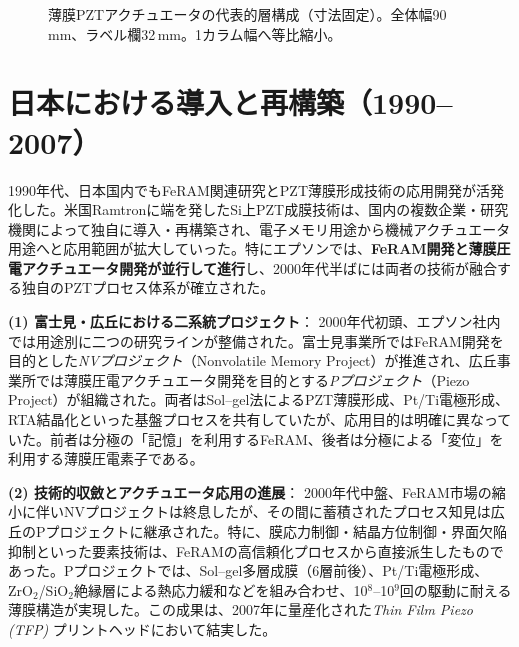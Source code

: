 \documentclass[conference]{IEEEtran}
\begin{document}
\begin{figure}[!t]
{%
}
\caption{薄膜PZTアクチュエータの代表的層構成（寸法固定）。全体幅90\,mm、ラベル欄32\,mm。1カラム幅へ等比縮小。}
\label{fig:stack}
\end{figure}

\section{日本における導入と再構築（1990--2007）}
1990年代、日本国内でもFeRAM関連研究とPZT薄膜形成技術の応用開発が活発化した。米国Ramtronに端を発したSi上PZT成膜技術は、国内の複数企業・研究機関によって独自に導入・再構築され、電子メモリ用途から機械アクチュエータ用途へと応用範囲が拡大していった。特にエプソンでは、\textbf{FeRAM開発と薄膜圧電アクチュエータ開発が並行して進行}し、2000年代半ばには両者の技術が融合する独自のPZTプロセス体系が確立された。

\medskip
\noindent
\textbf{(1) 富士見・広丘における二系統プロジェクト}：
2000年代初頭、エプソン社内では用途別に二つの研究ラインが整備された。富士見事業所ではFeRAM開発を目的とした\textit{NVプロジェクト}（Nonvolatile Memory Project）が推進され、広丘事業所では薄膜圧電アクチュエータ開発を目的とする\textit{Pプロジェクト}（Piezo Project）が組織された。両者はSol--gel法によるPZT薄膜形成、Pt/Ti電極形成、RTA結晶化といった基盤プロセスを共有していたが、応用目的は明確に異なっていた。前者は分極の「記憶」を利用するFeRAM、後者は分極による「変位」を利用する薄膜圧電素子である。

\medskip
\noindent
\textbf{(2) 技術的収斂とアクチュエータ応用の進展}：
2000年代中盤、FeRAM市場の縮小に伴いNVプロジェクトは終息したが、その間に蓄積されたプロセス知見は広丘のPプロジェクトに継承された。特に、膜応力制御・結晶方位制御・界面欠陥抑制といった要素技術は、FeRAMの高信頼化プロセスから直接派生したものであった。Pプロジェクトでは、Sol--gel多層成膜（6層前後）、Pt/Ti電極形成、ZrO$_2$/SiO$_2$絶縁層による熱応力緩和などを組み合わせ、10$^8$--10$^9$回の駆動に耐える薄膜構造が実現した。この成果は、2007年に量産化された\textit{Thin Film Piezo (TFP)} プリントヘッドにおいて結実した。
\end{document}
